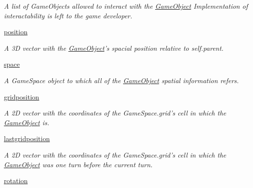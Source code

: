 \begin{DoxyCompactItemize}
\begin{DoxyCompactList}\small\item\em \-A list of \-Game\-Objects allowed to interact with the \hyperlink{classGameObject_1_1GameObject}{\-Game\-Object} \-Implementation of interactability is left to the game developer. \end{DoxyCompactList}\item 
\hypertarget{classGameObject_1_1GameObject_a2c3d51c7d53086f093ba84dcd0b12611}{\hyperlink{classGameObject_1_1GameObject_a2c3d51c7d53086f093ba84dcd0b12611}{position}}\label{classGameObject_1_1GameObject_a2c3d51c7d53086f093ba84dcd0b12611}

\begin{DoxyCompactList}\small\item\em \-A 3\-D vector with the \hyperlink{classGameObject_1_1GameObject}{\-Game\-Object}'s spacial position relative to self.\-parent. \end{DoxyCompactList}\item 
\hypertarget{classGameObject_1_1GameObject_a20ee6e5619e5bda604667f3c5427302f}{\hyperlink{classGameObject_1_1GameObject_a20ee6e5619e5bda604667f3c5427302f}{space}}\label{classGameObject_1_1GameObject_a20ee6e5619e5bda604667f3c5427302f}

\begin{DoxyCompactList}\small\item\em \-A \-Game\-Space object to which all of the \hyperlink{classGameObject_1_1GameObject}{\-Game\-Object} spatial information refers. \end{DoxyCompactList}\item 
\hypertarget{classGameObject_1_1GameObject_ae6912b906836360bae391f4b8118834b}{\hyperlink{classGameObject_1_1GameObject_ae6912b906836360bae391f4b8118834b}{gridposition}}\label{classGameObject_1_1GameObject_ae6912b906836360bae391f4b8118834b}

\begin{DoxyCompactList}\small\item\em \-A 2\-D vector with the coordinates of the \-Game\-Space.\-grid's cell in which the \hyperlink{classGameObject_1_1GameObject}{\-Game\-Object} is. \end{DoxyCompactList}\item 
\hyperlink{classGameObject_1_1GameObject_afa8af1b16a78c3ce29209e143caa6471}{lastgridposition}
\begin{DoxyCompactList}\small\item\em \-A 2\-D vector with the coordinates of the \-Game\-Space.\-grid's cell in which the \hyperlink{classGameObject_1_1GameObject}{\-Game\-Object} was one turn before the current turn. \end{DoxyCompactList}\item 
\hypertarget{classGameObject_1_1GameObject_a6a9ceea877a21a84e1f452cefc75f73e}{\hyperlink{classGameObject_1_1GameObject_a6a9ceea877a21a84e1f452cefc75f73e}{rotation}}\label{classGameObject_1_1GameObject_a6a9ceea877a21a84e1f452cefc75f73e}


\end{DoxyCompactItemize}
